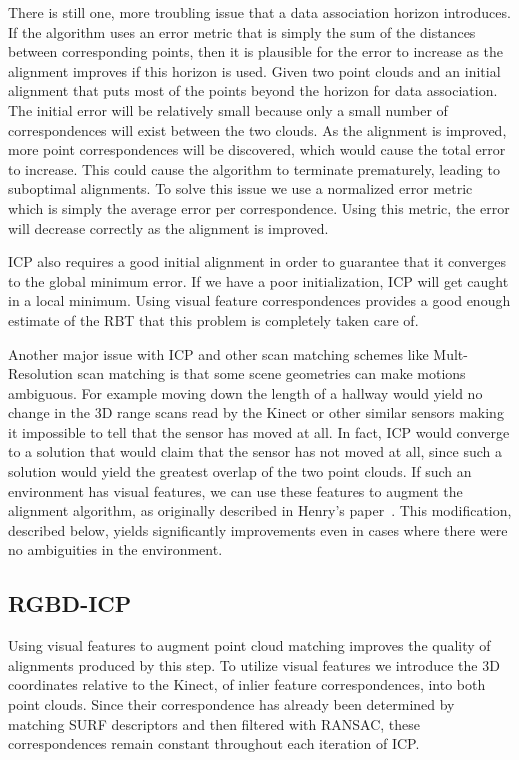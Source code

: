 \documentclass[letterpaper, 10pt, conference]{ieeeconf}
\begin{document}
	There is still one, more troubling issue that a data association horizon introduces.  If the algorithm uses an error metric that is simply the sum of the distances between corresponding points, then it is plausible for the error to increase as the alignment improves if this horizon is used.  Given two point clouds and an initial alignment that puts most of the points beyond the horizon for data association.  The initial error will be relatively small because only a small number of correspondences will exist between the two clouds.  As the alignment is improved, more point correspondences will be discovered, which would cause the total error to increase.  This could cause the algorithm to terminate prematurely, leading to suboptimal alignments.  To solve this issue we use a normalized error metric which is simply the average error per correspondence.  Using this metric, the error will decrease correctly as the alignment is improved.

	ICP also requires a good initial alignment in order to guarantee that it converges to the global minimum error.  If we have a poor initialization, ICP will get caught in a local minimum.  Using visual feature correspondences provides a good enough estimate of the RBT that this problem is completely taken care of.

	Another major issue with ICP and other scan matching schemes like Mult-Resolution scan matching is that some scene geometries can make motions ambiguous.  For example moving down the length of a hallway would yield no change in the 3D range scans read by the Kinect or other similar sensors making it impossible to tell that the sensor has moved at all.  In fact, ICP would converge to a solution that would claim that the sensor has not moved at all, since such a solution would yield the greatest overlap of the two point clouds.  If such an environment has visual features, we can use these features to augment the alignment algorithm, as originally described in Henry's paper~\cite{Henry2010rgbd}.  This modification, described below, yields significantly improvements even in cases where there were no ambiguities in the environment.

\subsection{RGBD-ICP}
Using visual features to augment point cloud matching improves the quality of alignments produced by this step.    To utilize visual features we introduce the 3D coordinates relative to the Kinect, of inlier feature correspondences, into both point clouds.  Since their correspondence has already been determined by matching SURF descriptors and then filtered with RANSAC, these correspondences remain constant throughout each iteration of ICP.
\end{document}
